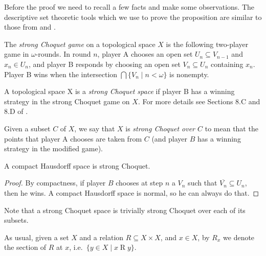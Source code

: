 	Before the proof we need to recall a few facts and make some observations. The descriptive set theoretic tools which we use to prove the proposition are similar to those from \cite{KMS14} and \cite{KR16}.
	
	\begin{dfn}
		The {\em strong Choquet game} on a topological space $X$ is the following two-player game in $\omega$-rounds. In round $n$, player A chooses an open set
		$U_n \subseteq V_{n-1}$ and $x_n \in U_n$, and player B responds by choosing an open set $V_n \subseteq U_n$
		containing $x_n$. Player B wins when the intersection $\bigcap \{V_n \mid n < \omega\}$ is nonempty.
		
		A topological space X is a {\em strong Choquet space} if player B has a winning strategy in the strong Choquet game on $X$. For more details see Sections 8.C and 8.D of \cite[Chapter I]{Kec95}.
		
		Given a subset $C$ of $X$, we say that $X$ is {\em strong Choquet over $C$} to mean that the points that player A chooses are taken from $C$ (and player $B$ has a winning strategy in the modified game).
	\end{dfn}
	
	\begin{fct}
		A compact Hausdorff space is strong Choquet.
	\end{fct}
	\begin{proof}
		By compactness, if player $B$ chooses at step $n$ a $V_n$ such that $\overline{V_n}\subseteq U_n$, then he wins. A compact Hausdorff space is normal, so he can always do that.
	\end{proof}
	
	\begin{rem}
		Note that a strong Choquet space is trivially strong Choquet over each of its subsets.\xqed{\lozenge}
	\end{rem}
	
	
	As usual, given a set $X$ and a relation $R \subseteq X \times X$, and $x \in X$, by $R_x$ we denote the section of $R$ at $x$, i.e.\ $\{y \in X \mid x \mathrel{R} y \}$.
	
